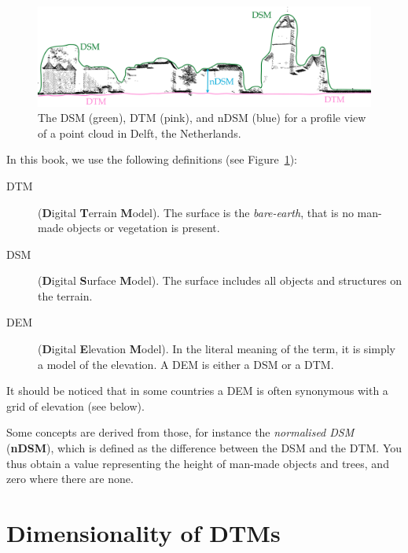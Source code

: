 \begin{figure}
  \includegraphics[width=0.9\linewidth]{figs/destm}
  \caption{The DSM (green), DTM (pink), and nDSM (blue) for a profile view of a point cloud in Delft, the Netherlands.}%
\label{fig:dtmdsm}
\end{figure}
In this book, we use the following definitions (see Figure~\ref{fig:dtmdsm}):
\begin{description}
  \item[DTM] (\textbf{D}igital \textbf{T}errain \textbf{M}odel). The surface is the \emph{bare-earth}, that is no man-made objects or vegetation is present.
  \item[DSM] (\textbf{D}igital \textbf{S}urface \textbf{M}odel). The surface includes all objects and structures on the terrain.
  \item[DEM] (\textbf{D}igital \textbf{E}levation \textbf{M}odel). In the literal meaning of the term, it is simply a model of the elevation. A DEM is either a DSM or a DTM\@. 
\end{description}

It should be noticed that in some countries a DEM is often synonymous with a grid of elevation (see below).

Some concepts are derived from those, for instance the \emph{normalised DSM} (\textbf{nDSM}),%
which is defined as the difference between the DSM and the DTM\@.
You thus obtain a value representing the height of man-made objects and trees, and zero where there are none.




%
\section{Dimensionality of DTMs}

